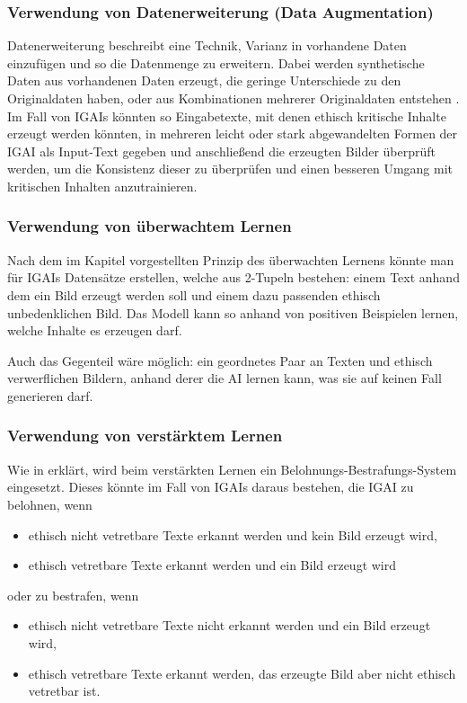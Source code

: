 \documentclass[12pt]{report}
\begin{document}
\subsubsection{Verwendung von Datenerweiterung (Data Augmentation)}
Datenerweiterung beschreibt eine Technik, Varianz in vorhandene Daten einzufügen und so die Datenmenge zu erweitern. Dabei werden synthetische Daten aus vorhandenen Daten erzeugt, die geringe Unterschiede zu den Originaldaten haben, oder aus Kombinationen mehrerer Originaldaten entstehen \cite[S. 2]{Shorten}. %
Im Fall von IGAIs könnten so Eingabetexte, mit denen ethisch kritische Inhalte erzeugt werden könnten, in mehreren leicht oder stark abgewandelten Formen der IGAI als Input-Text 
gegeben und anschließend die erzeugten Bilder überprüft werden, um die Konsistenz dieser zu überprüfen und einen besseren Umgang mit kritischen Inhalten anzutrainieren.  

\subsubsection{Verwendung von überwachtem Lernen}\label{Supervised Learning}
Nach dem im Kapitel  vorgestellten Prinzip des überwachten Lernens könnte man für IGAIs Datensätze erstellen, welche aus 2-Tupeln bestehen: einem Text anhand dem ein Bild erzeugt werden soll und einem dazu passenden ethisch unbedenklichen Bild. Das Modell kann so anhand von positiven Beispielen lernen, welche Inhalte es erzeugen darf.

Auch das Gegenteil wäre möglich: ein geordnetes Paar an Texten und ethisch verwerflichen Bildern, anhand derer die AI lernen kann, was sie auf keinen Fall generieren darf.

\subsubsection{Verwendung von verstärktem Lernen}
Wie in  erklärt, wird beim verstärkten Lernen ein Belohnungs-Bestrafungs-System eingesetzt. Dieses könnte im Fall von IGAIs daraus bestehen, die IGAI zu belohnen, wenn 
\begin{itemize}
    \item ethisch nicht vetretbare Texte erkannt werden und kein Bild erzeugt wird,
    \item ethisch vetretbare Texte erkannt werden und ein Bild erzeugt wird
\end{itemize}
oder zu bestrafen, wenn
\begin{itemize}
    \item ethisch nicht vetretbare Texte nicht erkannt werden und ein Bild erzeugt wird,
    \item ethisch vetretbare Texte erkannt werden, das erzeugte Bild aber nicht ethisch vetretbar ist.
\end{itemize}  
\end{document}
